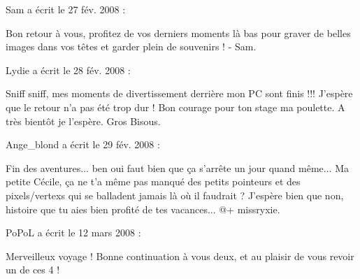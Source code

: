 \medskip
Sam a écrit le 27 fév. 2008 :
\begin{displayquote}
Bon retour à vous, profitez de vos derniers moments là bas pour graver de belles images dans vos têtes et garder plein de souvenirs !
- Sam.
\end{displayquote}

\medskip
Lydie a écrit le 28 fév. 2008 :
\begin{displayquote}
Sniff sniff, mes moments de divertissement derrière mon PC sont finis !!!
J'espère que le retour n'a pas été trop dur !
Bon courage pour ton stage ma poulette.
A très bientôt je l'espère.
Gros Bisous.
\end{displayquote}

\medskip
Ange\_blond a écrit le 29 fév. 2008 :
\begin{displayquote}
Fin des aventures... ben oui faut bien que ça s'arrête un jour quand même...
Ma petite Cécile, ça ne t'a même pas manqué des petits pointeurs et des pixels/vertexs qui se balladent jamais là où il faudrait ?
J'espère bien que non, histoire que tu aies bien profité de tes vacances...
@+ missryxie.
\end{displayquote}

\medskip
PoPoL a écrit le 12 mars 2008 :
\begin{displayquote}
Merveilleux voyage ! Bonne continuation à vous deux, et au plaisir de vous revoir un de ces 4 !
\end{displayquote}

\vfill

